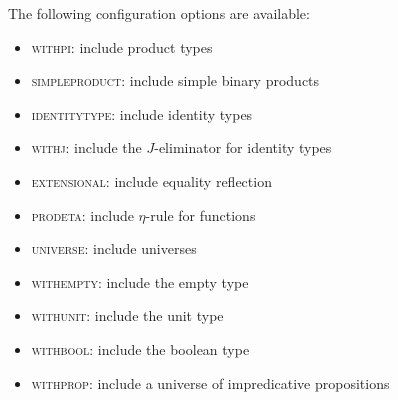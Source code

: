 
The following configuration options are available:
%
\begin{itemize}
\item \textsc{withpi}: include product types
\item \textsc{simpleproduct}: include simple binary products
\item \textsc{identitytype}: include identity types
\item \textsc{withj}: include the $J$-eliminator for identity types
\item \textsc{extensional}: include equality reflection
\item \textsc{prodeta}: include $\eta$-rule for functions
\item \textsc{universe}: include universes
\item \textsc{withempty}: include the empty type
\item \textsc{withunit}: include the unit type
\item \textsc{withbool}: include the boolean type
\item \textsc{withprop}: include a universe of impredicative propositions
\end{itemize}